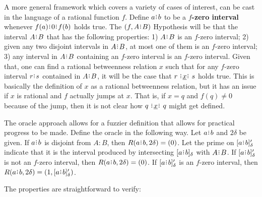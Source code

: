 \documentclass[12pt]{article}
\begin{document}
A more general framework which covers a variety of cases of interest, can be cast in the language of a rational function $f$. Define $a\rint b$ to be a \textbf{$f$-zero interval} whenever $f(a)\rint 0\rint f(b)$ holds true. The $(f, A \rint B)$ Hypothesis will be that the interval $A \rint B$ that has the following properties: 1) $A \rint B$ is an $f$-zero interval; 2) given any two disjoint intervals in $A \rint B$, at most one of them is an $f$-zero interval; 3) any interval in $A \rint B$ containing an $f$-zero interval is an $f$-zero interval. Given that, one can find a rational betweenness relation $x$ such that for any $f$-zero interval $r\rint s$ contained in $A \rint B$, it will be the case that $r \xrel s$ holds true. This is basically the definition of $x$ as a rational betweenness relation, but it has an issue if $x$ is rational and $f$ actually jumps at $x$. That is, if $x=q$ and $f(q) \neq 0$ because of the jump, then it is not clear how $q \xrel q$ might get defined. 

The oracle approach allows for a fuzzier definition that allows for practical progress to be made. Define the oracle in the following way. Let $a \rint b$ and $2\delta$ be given. If $a \rint b$ is disjoint from $A:B$, then $R(a \rint b, 2\delta) = (0)$. Let the prime on $\clhalo{a \rint b}'$ indicate that it is the interval produced by intersecting $\clhalo{a \rint b}$ with $A \rint B$. If $\clhalo{a \rint b}'$ is not an $f$-zero interval, then $R(a \rint b, 2\delta) = (0)$. If $\clhalo{a \rint b}'$ is an $f$-zero interval, then $R(a \rint b, 2\delta) = (1, \clhalo{a \rint b}')$.

The properties are straightforward to verify:
\end{document}
